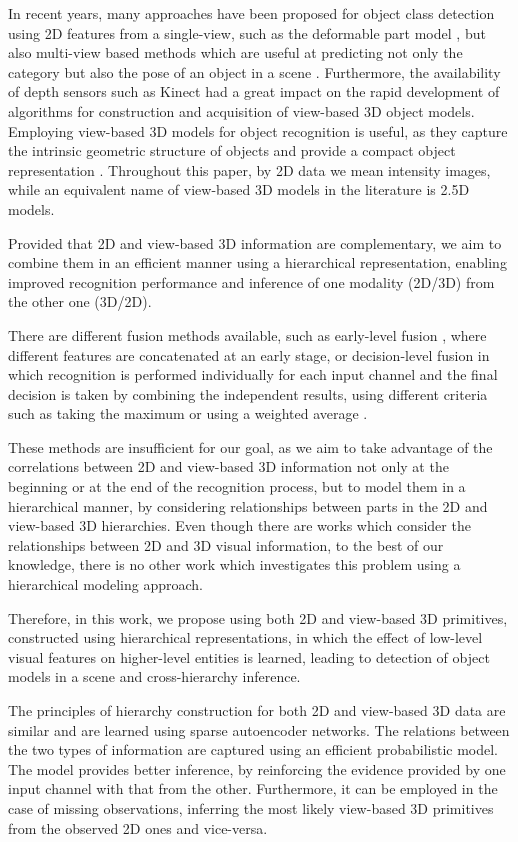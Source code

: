 \documentclass[conference]{IEEEtran}
\begin{document}
In recent years, many approaches have been proposed for object class detection using 2D features from a single-view, such as the deformable part model \cite{Felzenswalb2010}, but also multi-view based methods which are useful at predicting not only the category but also the pose of an object in a scene \cite{Teney2014}. Furthermore, the availability of depth sensors such as Kinect had a great impact on the rapid development of algorithms for construction and acquisition of view-based 3D object models. Employing view-based 3D models for object recognition is useful, as they capture the intrinsic geometric structure of objects and provide a compact object representation \cite{Liebelt2010}. Throughout this paper, by 2D data we mean intensity images, while an equivalent name of view-based 3D models in the literature is 2.5D models.

Provided that 2D and view-based 3D information are complementary, we aim to combine them in an efficient manner using a hierarchical representation, enabling improved recognition performance and inference of one modality (2D/3D) from the other one (3D/2D). 

There are different fusion methods available, such as early-level fusion \cite{Arca2007}, where different features are concatenated at an early stage, or decision-level fusion \cite{Soltana2010} in which recognition is performed individually for each input channel and the final decision is taken by combining the independent results, using different criteria such as taking the maximum or using a weighted average \cite{Mahmoudi2013}.

These methods are insufficient for our goal, as we aim to take advantage of the correlations between 2D and view-based 3D information not only at the beginning or at the end of the recognition process, but to model them in a hierarchical manner, by considering relationships between parts in the 2D and view-based 3D hierarchies. Even though there are works which consider the relationships between 2D and 3D visual information, to the best of our knowledge, there is no other work which investigates this problem using a hierarchical modeling approach.

Therefore, in this work, we propose using both 2D and view-based 3D primitives, constructed using hierarchical representations, in which the effect of low-level visual features on higher-level entities is learned, leading to detection of object models in a scene and cross-hierarchy inference. 

The principles of hierarchy construction for both 2D and view-based 3D data are similar and are learned using sparse autoencoder networks. The relations between the two types of information are captured using an efficient probabilistic model. The model provides better inference, by reinforcing the evidence provided by one input channel with that from the other. Furthermore, it can be employed in the case of missing observations, inferring the most likely view-based 3D primitives from the observed 2D ones and vice-versa. 
\end{document}
